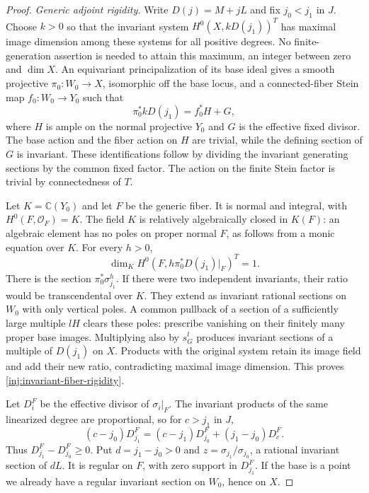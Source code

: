 \begin{proof}
\smallskip\noindent\textit{Generic adjoint rigidity.}
Write $D(j)=M+jL$ and fix $j_0<j_1$ in $J$.
Choose $k>0$ so that the invariant system
$H^0(X,kD(j_1))^T$ has maximal image dimension among these systems
for all positive degrees.  No finite-generation assertion is needed
to attain this maximum, an integer between zero and $\dim X$.
An equivariant principalization of its base ideal gives a smooth
projective $\pi_0:W_0\to X$, isomorphic off the base locus, and
a connected-fiber Stein map $f_0:W_0\to Y_0$ such that
\[
 \pi_0^*kD(j_1)=f_0^*H+G,
\]
where $H$ is ample on the normal projective $Y_0$ and $G$ is the
effective fixed divisor.  The base action and the fiber action on
$H$ are trivial, while the defining section of $G$ is invariant.
These identifications follow by dividing the invariant generating
sections by the common fixed factor.  The action on the finite
Stein factor is trivial by connectedness of $T$.

Let $K=\mathbb C(Y_0)$ and let $F$ be the generic fiber.  It is
normal and integral, with $H^0(F,\mathcal O_F)=K$.
The field $K$ is relatively algebraically closed in $K(F)$:
an algebraic element has no poles on proper normal $F$, as follows
from a monic equation over $K$.  For every $h>0$,
\begin{equation}\label{inj:invariant-fiber-rigidity}
 \dim_K H^0(F,h\pi_0^*D(j_1)|_F)^T=1.
\end{equation}
There is the section $\pi_0^*\sigma_{j_1}^h$.  If there were
two independent invariants, their ratio would be transcendental
over $K$.  They extend as invariant rational sections on $W_0$
with only vertical poles.  A common pullback of a section of a
sufficiently large multiple $lH$ clears these poles: prescribe
vanishing on their finitely many proper base images.  Multiplying
also by $s_G^l$ produces invariant sections of a multiple of
$D(j_1)$ on $X$.  Products with the original system retain its
image field and add their new ratio, contradicting maximal image
dimension.  This proves \eqref{inj:invariant-fiber-rigidity}.

Let $D_i^F$ be the effective divisor of $\sigma_i|_F$.
The invariant products of the same linearized degree are proportional,
so for $c>j_1$ in $J$,
\[
 (c-j_0)D_{j_1}^F
 =(c-j_1)D_{j_0}^F+(j_1-j_0)D_c^F.
\]
Thus $D_{j_1}^F-D_{j_0}^F\ge0$.  Put $d=j_1-j_0>0$ and
$z=\sigma_{j_1}/\sigma_{j_0}$, a rational invariant section
of $dL$.  It is regular on $F$, with zero support in $D_{j_1}^F$.
If the base is a point we already have a regular invariant section
on $W_0$, hence on $X$.


\end{proof}
